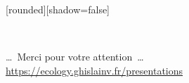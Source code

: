 
{
  [rounded][shadow=false]
  \begin{frame}[plain]
  \bcols
  \bcol{0.75cm}
    ~
  \ecol
  \bcol{9.25cm}
  	\vspace{5cm}
    \begin{block}{}
      \begin{center}
        \ldots~Merci pour votre attention~\ldots \\
        \url{https://ecology.ghislainv.fr/presentations}
      \end{center}
    \end{block}
  \ecol
  \ecols
  \end{frame}
}